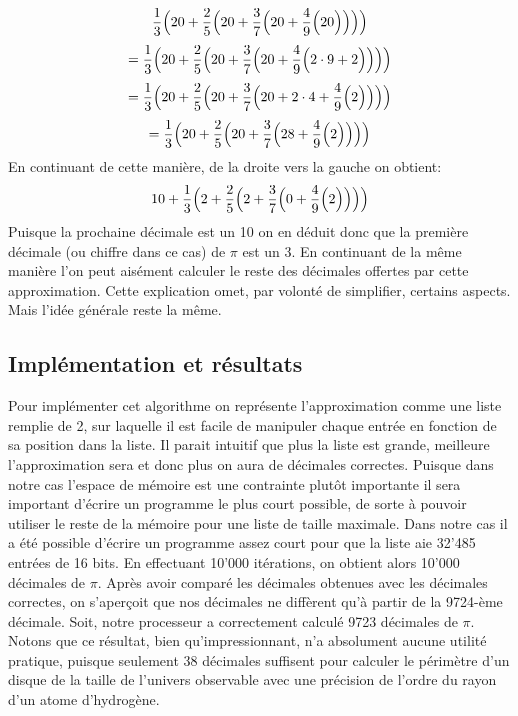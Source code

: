 \documentclass{article}
\begin{document}
$$
\frac{1}{3}\Bigl(20+\frac{2}{5}\Bigl(20+\frac{3}{7}\Bigl(20+\frac{4}{9}\Bigl(20\Bigr)\Bigr)\Bigr)\Bigr)
$$
$$
=\frac{1}{3}\Bigl(20+\frac{2}{5}\Bigl(20+\frac{3}{7}\Bigl(20+\frac{4}{9}\Bigl(2\cdot9 + 2\Bigr)\Bigr)\Bigr)\Bigr)
$$
$$
=\frac{1}{3}\Bigl(20+\frac{2}{5}\Bigl(20+\frac{3}{7}\Bigl(20+2\cdot4+\frac{4}{9}\Bigl(2\Bigr)\Bigr)\Bigr)\Bigr)
$$
$$
=\frac{1}{3}\Bigl(20+\frac{2}{5}\Bigl(20+\frac{3}{7}\Bigl(28+\frac{4}{9}\Bigl(2\Bigr)\Bigr)\Bigr)\Bigr)
$$
En continuant de cette manière, de la droite vers la gauche on obtient:
$$
10 + \frac{1}{3}\Bigl(2+\frac{2}{5}\Bigl(2+\frac{3}{7}\Bigl(0+\frac{4}{9}\Bigl(2\Bigr)\Bigr)\Bigr)\Bigr)
$$
Puisque la prochaine décimale est un 10 on en déduit donc que la première décimale (ou chiffre dans ce cas) de $\pi$ est un 3. En continuant de la même manière l'on peut aisément calculer le reste des décimales offertes par cette approximation. Cette explication omet, par volonté de simplifier, certains aspects. Mais l'idée générale reste la même. 
\subsection{Implémentation et résultats}
Pour implémenter cet algorithme on représente l'approximation comme une liste remplie de 2, sur laquelle il est facile de manipuler chaque entrée en fonction de sa position dans la liste. Il parait intuitif que plus la liste est grande, meilleure l'approximation sera et donc plus on aura de décimales correctes. Puisque dans notre cas l'espace de mémoire est une contrainte plutôt importante il sera important d'écrire un programme le plus court possible, de sorte à pouvoir utiliser le reste de la mémoire pour une liste de taille maximale. Dans notre cas il a été possible d'écrire un programme assez court pour que la liste aie 32'485 entrées de 16 bits. En effectuant 10'000 itérations, on obtient alors 10'000 décimales de $\pi$. Après avoir comparé les décimales obtenues avec les décimales correctes, on s'aperçoit que nos décimales ne diffèrent qu'à partir de la 9724-ème décimale. Soit, notre processeur a correctement calculé 9723 décimales de $\pi$. Notons que ce résultat, bien qu'impressionnant, n'a absolument aucune utilité pratique, puisque seulement 38 décimales suffisent pour calculer le périmètre d'un disque de la taille de l'univers observable avec une précision de l'ordre du rayon d'un atome d'hydrogène. \cite{yates_2024}
\end{document}
